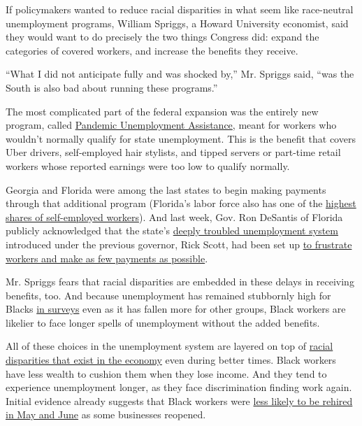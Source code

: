 If policymakers wanted to reduce racial disparities in what seem like
race-neutral unemployment programs, William Spriggs, a Howard University
economist, said they would want to do precisely the two things Congress
did: expand the categories of covered workers, and increase the benefits
they receive.

``What I did not anticipate fully and was shocked by,'' Mr. Spriggs
said, ``was the South is also bad about running these programs.''

The most complicated part of the federal expansion was the entirely new
program, called
\href{https://www.dol.gov/coronavirus/unemployment-insurance\#:~:text=The\%20new\%20law\%20creates\%20the,)\%2C\%20PEUC\%2C\%20PUA\%2C\%20Extended}{Pandemic
Unemployment Assistance}, meant for workers who wouldn't normally
qualify for state unemployment. This is the benefit that covers Uber
drivers, self-employed hair stylists, and tipped servers or part-time
retail workers whose reported earnings were too low to qualify normally.

Georgia and Florida were among the last states to begin making payments
through that additional program (Florida's labor force also has one of
the
\href{https://bfi.uchicago.edu/wp-content/uploads/BFI_White-Paper_Koustas_4.2020.pdf}{highest
shares of self-employed workers}). And last week, Gov. Ron DeSantis of
Florida publicly acknowledged that the state's
\href{https://www.nytimes3xbfgragh.onion/2020/04/23/us/florida-coronavirus-unemployment.html}{deeply
troubled unemployment system} introduced under the previous governor,
Rick Scott, had been set up
\href{https://miami.cbslocal.com/2020/08/04/exclusive-governor-ron-desantis-acknowledges-florida-unemployment-system-designed-frustrate/}{to
frustrate workers and make as few payments as possible}.

Mr. Spriggs fears that racial disparities are embedded in these delays
in receiving benefits, too. And because unemployment has remained
stubbornly high for Blacks
\href{https://www.nytimes3xbfgragh.onion/interactive/2020/05/13/upshot/coronavirus-america-job-losses-slowing-tracker.html}{in
surveys} even as it has fallen more for other groups, Black workers are
likelier to face longer spells of unemployment without the added
benefits.

All of these choices in the unemployment system are layered on top of
\href{https://www.nytimes3xbfgragh.onion/2020/06/01/business/economy/black-workers-inequality-economic-risks.html}{racial
disparities that exist in the economy} even during better times. Black
workers have less wealth to cushion them when they lose income. And they
tend to experience unemployment longer, as they face discrimination
finding work again. Initial evidence already suggests that Black workers
were
\href{https://eml.berkeley.edu/~jrothst/workingpapers/bartik_bertrand_etal_july212020.pdf}{less
likely to be rehired in May and June} as some businesses reopened.

